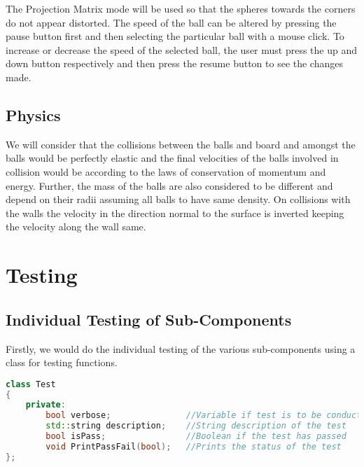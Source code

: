 \documentclass{article}
\begin{document}
\par\noindent The Projection Matrix mode will be used so that the spheres towards the corners do not appear distorted. The speed of the ball can be altered by pressing the pause button first and then selecting the particular ball with a mouse click. To increase or decrease the speed of the selected ball, the user must press the up and down button respectively and then press the resume button to see the changes made.

\subsection{Physics}
We will consider that the collisions between the balls and board and amongst the balls would be perfectly elastic and the final  velocities of the balls involved in collision would be according to the laws of conservation of momentum and energy. Further, the mass of the balls are also considered to be different and depend on their radii assuming all balls to have same density. On collisions with the walls the velocity in the direction normal to the surface is inverted keeping the velocity along the wall same.


\section{Testing}
\subsection{Individual Testing of Sub-Components}
Firstly, we would do the individual testing of the various sub-components using a class for testing functions.


\begin{lstlisting}[language=C++, caption={Class Parameters for Test}]
class Test
{
	private:
		bool verbose;               //Variable if test is to be conducted
		std::string description;    //String description of the test
		bool isPass;                //Boolean if the test has passed 
		void PrintPassFail(bool);   //Prints the status of the test
};
\end{lstlisting}
\end{document}
